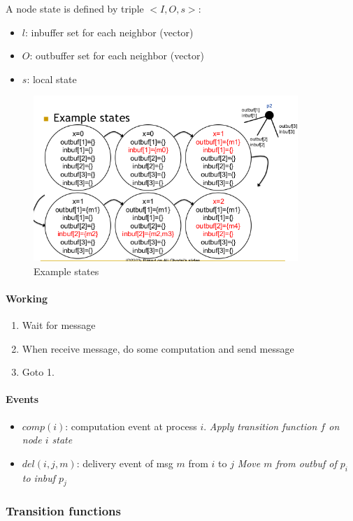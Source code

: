 A node state is defined by triple $<I, O, s>$:
\begin{itemize}
    \item $l$: inbuffer set for each neighbor (vector)
    \item $O$: outbuffer set for each neighbor (vector)
    \item $s$: local state
\end{itemize}

\begin{figure}[!ht]
    \centering
    \includegraphics[width=10cm]{img/node.png}
    \caption{Example states}
\end{figure}
\FloatBarrier{}

\paragraph{Working}
\begin{enumerate}
    \item Wait for message
    \item When receive message, do some computation and send message
    \item Goto 1.
\end{enumerate}

\paragraph{Events}
\begin{itemize}
    \item $comp(i)$: computation event at process $i$.
        \subitem{} \textit{Apply transition function $f$ on node $i$ state}
    \item $del(i, j, m)$: delivery event of msg $m$ from $i$ to $j$
        \subitem{} \textit{Move $m$ from outbuf of $p_i$ to inbuf $p_j$}
\end{itemize}

\subsubsection{Transition functions}

